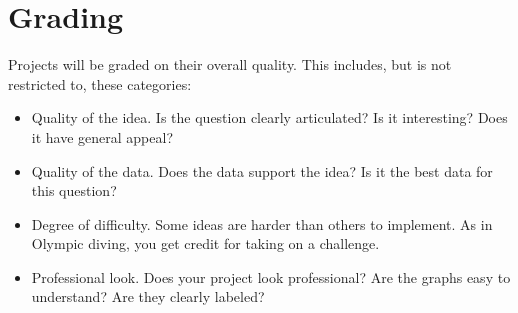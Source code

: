 \documentclass[11pt]{article}
\begin{document}
\section*{Grading}

Projects will be graded on their overall quality.  This includes, but is not restricted to, 
these categories:
%
\begin{itemize}
\item Quality of the idea.  Is the question clearly articulated?  Is it interesting?    
Does it have general appeal?
\item Quality of the data.  Does the data support the idea?   
Is it the best data for this question?  
\item Degree of difficulty.  Some ideas are harder than others to implement. 
As in Olympic diving, you get credit for taking on a challenge. 
\item Professional look.  Does your project look professional?  Are the graphs
easy to understand?  Are they clearly labeled?     
\end{itemize} 



\end{document}
